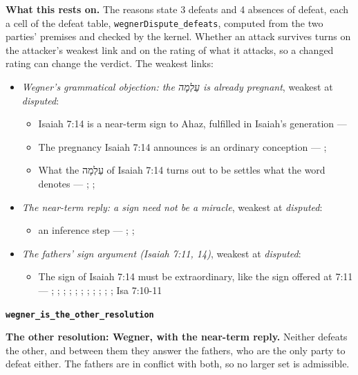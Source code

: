 \documentclass[11pt]{article}
\begin{document}
\par\noindent\textbf{What this rests on.} The reasons state 3 defeats and 4 absences of defeat, each a cell of the defeat table, \texttt{wegner\allowbreak{}Dispute\_\allowbreak{}defeats}, computed from the two parties' premises and checked by the kernel. Whether an attack survives turns on the attacker's weakest link and on the rating of what it attacks, so a changed rating can change the verdict. The weakest links:
\begin{itemize}
\item \emph{Wegner’s grammatical objection: the עַלְמָה is already pregnant}, weakest at \emph{disputed}:
\begin{itemize}
\item Isaiah 7:14 is a near-term sign to Ahaz, fulfilled in Isaiah’s generation --- \cite{brown-birth-messiah-1993}
\item The pregnancy Isaiah 7:14 announces is an ordinary conception --- \cite[476--478]{wegner-virgin-births-2011}; \cite[474]{postell-isaiah-messianic-2025}
\item What the עַלְמָה of Isaiah 7:14 turns out to be settles what the word denotes --- \cite[471--472]{wegner-virgin-births-2011}; \cite[468]{postell-isaiah-messianic-2025}; \cite[152]{rico-gentry-infant-king-2020}
\end{itemize}
\item \emph{The near-term reply: a sign need not be a miracle}, weakest at \emph{disputed}:
\begin{itemize}
\item an inference step --- \cite[64--65]{rhodea-did-matthew-conceive-2013}; \cite[469--470]{wegner-virgin-births-2011}; \cite[474]{postell-isaiah-messianic-2025}
\end{itemize}
\item \emph{The fathers’ sign argument (Isaiah 7:11, 14)}, weakest at \emph{disputed}:
\begin{itemize}
\item The sign of Isaiah 7:14 must be extraordinary, like the sign offered at 7:11 --- \cite[I.35]{origen-against-celsus-248}; \cite[84]{justin-dialogue-with-trypho-160}; \cite[III.21.6]{irenaeus-against-heresies-180}; \cite[9]{tertullian-answer-to-the-jews-200}; \cite[VII.1]{eusebius-demonstratio-evangelica-315}; \cite[12.22]{cyril-jerusalem-catechetical-lectures-350}; \cite[5]{chrysostom-homilies-matthew-390}; \cite[ad loc. Isa 7:14]{jerome-commentary-isaiah-410}; \cite[ad loc. Isa 7:14]{cyril-alexandria-commentary-isaiah}; \cite[ad loc. Isa 7:14]{theodoret-commentary-isaiah}; \cite[474]{postell-isaiah-messianic-2025}; Isa 7:10-11
\end{itemize}
\end{itemize}
\par\medskip\noindent\textbf{\texttt{wegner\_\allowbreak{}is\_\allowbreak{}the\_\allowbreak{}other\_\allowbreak{}resolution}}\par\nobreak\noindent
\textbf{The other resolution: Wegner, with the near-term reply.} Neither defeats the other, and between them they answer the fathers, who are the only party to defeat either. The fathers are in conflict with both, so no larger set is admissible.
\end{document}
